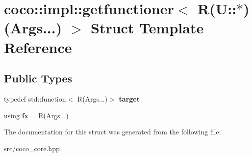 \hypertarget{structcoco_1_1impl_1_1getfunctioner_3_01_r_07_u_1_1_5_08_07_args_8_8_8_08_01_4}{}\section{coco\+:\+:impl\+:\+:getfunctioner$<$ R(U\+:\+:$\ast$)(Args...) $>$ Struct Template Reference}
\label{structcoco_1_1impl_1_1getfunctioner_3_01_r_07_u_1_1_5_08_07_args_8_8_8_08_01_4}
\subsection*{Public Types}
\begin{DoxyCompactItemize}
\item 
\hypertarget{structcoco_1_1impl_1_1getfunctioner_3_01_r_07_u_1_1_5_08_07_args_8_8_8_08_01_4_aef261d7a62b54d064177787cff33336f}{}typedef std\+::function$<$ R(Args...)$>$ {\bfseries target}\label{structcoco_1_1impl_1_1getfunctioner_3_01_r_07_u_1_1_5_08_07_args_8_8_8_08_01_4_aef261d7a62b54d064177787cff33336f}

\item 
\hypertarget{structcoco_1_1impl_1_1getfunctioner_3_01_r_07_u_1_1_5_08_07_args_8_8_8_08_01_4_a2490959e1992e8ec9903d0ec253c7cfc}{}using {\bfseries fx} = R(Args...)\label{structcoco_1_1impl_1_1getfunctioner_3_01_r_07_u_1_1_5_08_07_args_8_8_8_08_01_4_a2490959e1992e8ec9903d0ec253c7cfc}

\end{DoxyCompactItemize}


The documentation for this struct was generated from the following file\+:\begin{DoxyCompactItemize}
\item 
src/coco\+\_\+core.\+hpp\end{DoxyCompactItemize}
